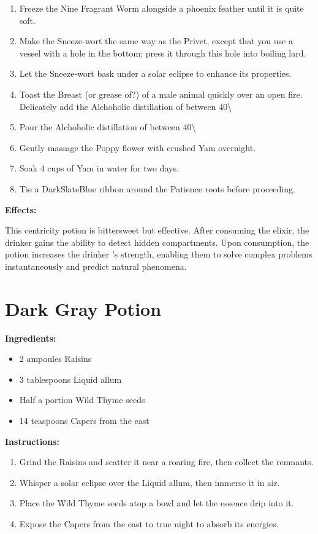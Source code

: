 \documentclass{article}
\begin{document}
\begin{enumerate}
  \item Freeze the Nine Fragrant Worm alongside a phoenix feather until it is quite soft.
  \item Make the Sneeze-wort the same way as the Privet, except that you use a vessel with a hole in the bottom; press it through this hole into boiling lard.
  \item Let the Sneeze-wort bask under a solar eclipse to enhance its properties.
  \item Toast the Breast (or grease of?) of a male animal quickly over an open fire. Delicately add the Alchoholic distillation of between 40\textbackslash{}%
  \item Pour the Alchoholic distillation of between 40\textbackslash{}%
  \item Gently massage the Poppy flower with crushed Yam overnight.
  \item Soak 4 cups of Yam in water for two days.
  \item Tie a DarkSlateBlue ribbon around the Patience roots before proceeding.
\end{enumerate}

\textbf{Effects:}

This centricity potion is bittersweet but effective. After consuming the elixir, the drinker gains the ability to detect hidden compartments. Upon consumption, the potion increases the drinker 's strength, enabling them to solve complex problems instantaneously and predict natural phenomena.

\newpage
\section*{Dark Gray Potion}

\textbf{Ingredients:}

\begin{itemize}
  \item 2 ampoules Raisins
  \item 3 tablespoons Liquid allum
  \item Half a portion Wild Thyme seeds
  \item 14 teaspoons Capers from the east
\end{itemize}

\textbf{Instructions:}

\begin{enumerate}
  \item Grind the Raisins and scatter it near a roaring fire, then collect the remnants.
  \item Whisper a solar eclipse over the Liquid allum, then immerse it in air.
  \item Place the Wild Thyme seeds atop a bowl and let the essence drip into it.
  \item Expose the Capers from the east to true night to absorb its energies.
\end{enumerate}
\end{document}
